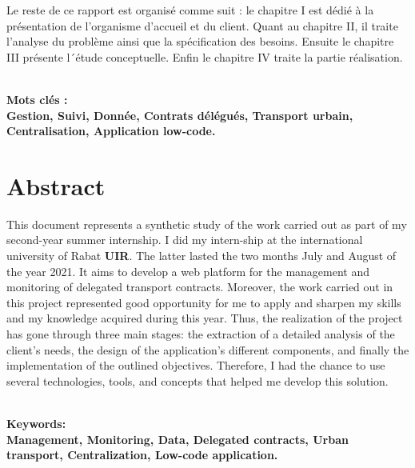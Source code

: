 \documentclass[a4paper]{report}
\begin{document}
\begin{doublespace}
	Le reste de ce rapport est organisé comme suit : le chapitre I est dédié à
	la présentation de
	l’organisme d’accueil et du client. Quant au chapitre II, il traite
	l’analyse du problème ainsi que la spécification des besoins. Ensuite le
	chapitre III présente l´étude conceptuelle. Enfin le chapitre IV traite la
	partie réalisation.

	\textbf	{\\Mots clés :\\ Gestion, Suivi, Donnée, Contrats délégués,
		Transport urbain, Centralisation, Application low-code.}

	\newpage

	\chapter*{\centering Abstract}

	This document represents a synthetic study of the work carried out as part
	of my second-year summer internship.
	I did my intern-ship at the international university of Rabat \textbf{UIR}.
	The latter lasted the two months
	July and August of the year 2021. It aims to develop a web platform for the
	management and monitoring of
	delegated transport contracts. Moreover, the work carried out in this
	project represented good opportunity
	for me to apply and sharpen my skills and my knowledge acquired during this
	year. Thus, the realization
	of the project has gone through three main stages: the extraction of a
	detailed analysis of the client's
	needs, the design of the application's different components, and finally
	the implementation of the outlined objectives.
	Therefore, I had the chance to use several technologies, tools, and
	concepts that helped me develop this solution.

	\textbf{\\Keywords:\\Management, Monitoring, Data, Delegated contracts,
		Urban transport, Centralization, Low-code application.}

\end{doublespace}

\newpage

\fancyhead[L]{\hspace*{5cm}}
\tableofcontents

\newpage
\listoffigures

\newpage
\renewcommand{\listtablename}{Table des tableaux}
\listoftables
\end{document}
